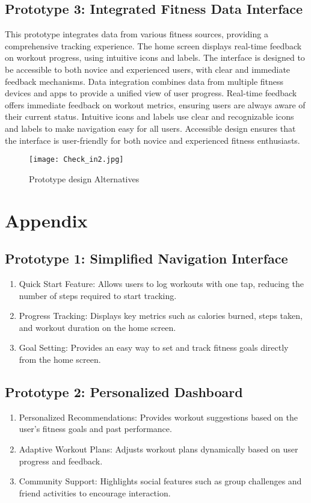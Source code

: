 \documentclass[
	letterpaper, %
]{jdf}
\begin{document}
\subsection {Prototype 3: Integrated Fitness Data Interface}
This prototype integrates data from various fitness sources, providing a comprehensive tracking experience. The home screen displays real-time feedback on workout progress, using intuitive icons and labels. The interface is designed to be accessible to both novice and experienced users, with clear and immediate feedback mechanisms. Data integration combines data from multiple fitness devices and apps to provide a unified view of user progress. Real-time feedback offers immediate feedback on workout metrics, ensuring users are always aware of their current status. Intuitive icons and labels use clear and recognizable icons and labels to make navigation easy for all users. Accessible design ensures that the interface is user-friendly for both novice and experienced fitness enthusiasts.

\begin{figure}
    \centering
    \texttt{[image: Check\_in2.jpg]}
    \caption{Prototype design Alternatives}
    \label{fig:enter-label}
\end{figure}

\newpage
\section{Appendix}
\subsection{Prototype 1: Simplified Navigation Interface}
\begin{enumerate}
        \item Quick Start Feature: Allows users to log workouts with one tap, reducing the number of steps required to start tracking.
        \item Progress Tracking: Displays key metrics such as calories burned, steps taken, and workout duration on the home screen.
        \item Goal Setting: Provides an easy way to set and track fitness goals directly from the home screen.
\end{enumerate}

\subsection{Prototype 2: Personalized Dashboard}
\begin{enumerate}
        \item Personalized Recommendations: Provides workout suggestions based on the user's fitness goals and past performance.
        \item Adaptive Workout Plans: Adjusts workout plans dynamically based on user progress and feedback.
        \item Community Support: Highlights social features such as group challenges and friend activities to encourage interaction.
\end{enumerate}
\end{document}
